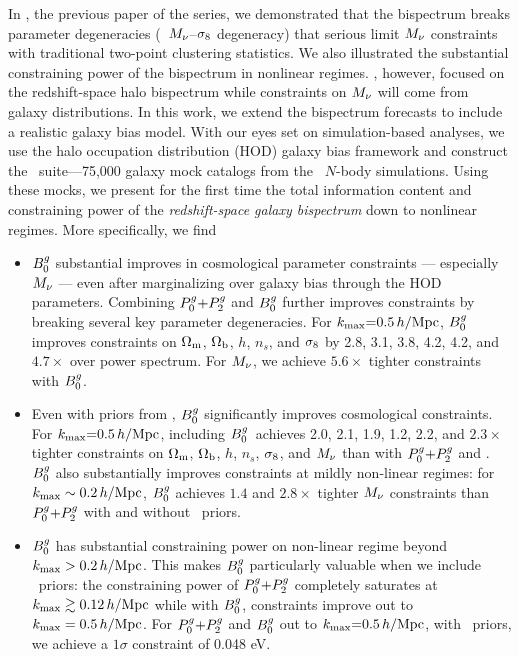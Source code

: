 In \cite{hahn2020}, the previous paper of the series, we demonstrated that the 
bispectrum breaks parameter degeneracies (\eg~$M_\nu$--$\sigma_8$ degeneracy) that 
serious limit $M_\nu$ constraints with traditional two-point clustering statistics. 
We also illustrated the substantial constraining power of the bispectrum in nonlinear regimes.
\cite{hahn2020}, however, focused on the redshift-space halo bispectrum while 
constraints on $M_\nu$ will come from galaxy distributions. %
In this work, we extend the \cite{hahn2020} bispectrum forecasts to
include a realistic galaxy bias model. With our eyes set on
simulation-based analyses, we use the halo occupation distribution (HOD) galaxy
bias framework and construct the \molino~suite---75,000 galaxy mock catalogs from the \quij~$N$-body 
simulations. Using these mocks, we present for the first time the total information
content and constraining power of the {\em redshift-space galaxy bispectrum} 
down to nonlinear regimes. More specifically, we find
\begin{itemize}
    \item $B^g_0$ substantial improves in cosmological parameter constraints ---
        especially $M_\nu$ --- even after marginalizing over galaxy bias through
        the HOD parameters. Combining $P^g_0{+}P^g_2$ and $B^g_0$ further improves
        constraints by breaking several key parameter degeneracies. For 
        $k_{\rm max}{=}0.5\,h/\mathrm{Mpc}$, $B^g_0$ improves constraints on 
        $\Omega_{\rm m}$, $\Omega_{\rm b}$, $h$, $n_s$, and $\sigma_8$ by 2.8, 3.1, 3.8, 4.2, 4.2, and 
        $4.7{\times}$ over power spectrum. For $M_\nu$, we achieve $5.6\times$ 
        tighter constraints with $B^g_0$.

    \item Even with priors from \planck, $B^g_0$ significantly improves
        cosmological constraints. For $k_{\rm max}{=}0.5\,h/\mathrm{Mpc}$, including 
        $B^g_0$~achieves 2.0, 2.1, 1.9, 1.2, 2.2, and $2.3\times$ tighter
        constraints on $\Omega_{\rm m}$, $\Omega_{\rm b}$, $h$, $n_s$, $\sigma_8$, and $M_\nu$ than with $P^g_0{+}P^g_2$
        and \planck. $B^g_0$ also substantially improves constraints at mildly non-linear regimes:
        for $k_{\rm max}\sim0.2\,h/\mathrm{Mpc}$, $B^g_0$ achieves $1.4$ and $2.8\times$ tighter
        $M_\nu$ constraints than $P^g_0{+}P^g_2$ with and without \planck~priors. 

    \item $B^g_0$ has substantial constraining power on non-linear regime beyond
        $k_{\rm max} > 0.2\,h/\mathrm{Mpc}$. This makes $B^g_0$ particularly valuable when we include
        \planck~priors: the constraining power of $P^g_0{+}P^g_2$ completely saturates 
        at $k_{\rm max} \gtrsim 0.12\,h/\mathrm{Mpc}$ while with $B^g_0$, constraints improve out to 
        $k_{\rm max}=0.5\,h/\mathrm{Mpc}$. For $P^g_0{+}P^g_2$ and $B^g_0$ out to $k_{\rm max}{=}0.5\,h/\mathrm{Mpc}$, with
        \planck~priors, we achieve a $1\sigma$ \smnu constraint of 0.048 eV.
\end{itemize}

